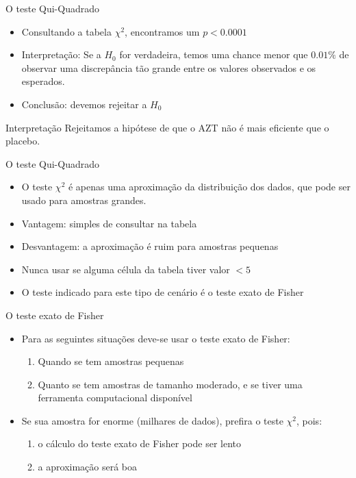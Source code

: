 \documentclass{beamer}
\begin{document}
\begin{frame}{O teste Qui-Quadrado}
  \begin{itemize}
  \item Consultando a tabela $\chi^2$, encontramos um $p<0.0001$
  \item Interpretação: Se a $H_0$ for verdadeira, temos uma
    chance menor que $0.01\%$ de observar uma discrepância tão grande
    entre os valores observados e os esperados.
  \item Conclusão: devemos \alert{rejeitar} a $H_0$
  \end{itemize}
  \begin{block}{Interpretação}
    Rejeitamos a hipótese de que o AZT não é mais eficiente que o
    placebo.
  \end{block}
\end{frame}

\begin{frame}{O teste Qui-Quadrado}
  \begin{itemize}
  \item O teste $\chi^2$ é apenas uma aproximação da distribuição dos
    dados, que pode ser usado para amostras grandes.
  \item Vantagem: simples de consultar na tabela
  \item Desvantagem: a aproximação é ruim para amostras pequenas
  \item Nunca usar se alguma célula da tabela tiver valor \alert{$<5$}
  \item O teste indicado para este tipo de cenário é o \alert{teste
      exato de Fisher}
  \end{itemize}
\end{frame}

\begin{frame}{O teste exato de Fisher}
  \begin{itemize}
  \item Para as seguintes situações deve-se usar o teste exato de
    Fisher:
    \begin{enumerate}
    \item Quando se tem amostras pequenas
    \item Quanto se tem amostras de tamanho moderado, e se tiver uma
      ferramenta computacional disponível
    \end{enumerate}
  \item Se sua amostra for enorme (milhares de dados), prefira o teste
    $\chi^2$, pois:
    \begin{enumerate}
    \item o cálculo do teste exato de Fisher pode ser lento
    \item a aproximação será boa
    \end{enumerate}
  \end{itemize}
\end{frame}
\end{document}
